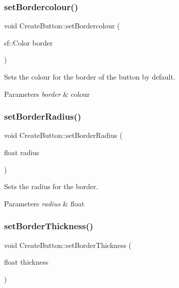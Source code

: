 \subsubsection{\texorpdfstring{set\+Bordercolour()}{setBordercolour()}}
{\footnotesize\ttfamily void Create\+Button\+::set\+Bordercolour (\begin{DoxyParamCaption}\item[{sf\+::\+Color}]{border }\end{DoxyParamCaption})}



Sets the colour for the border of the button by default. 


\begin{DoxyParams}{Parameters}
{\em border} & colour \\
\hline
\end{DoxyParams}
\mbox{\label{class_create_button_ae836b96adddce00e02cb38f503336ec1}} 
\subsubsection{\texorpdfstring{set\+Border\+Radius()}{setBorderRadius()}}
{\footnotesize\ttfamily void Create\+Button\+::set\+Border\+Radius (\begin{DoxyParamCaption}\item[{float}]{radius }\end{DoxyParamCaption})}



Sets the radius for the border. 


\begin{DoxyParams}{Parameters}
{\em radius} & float \\
\hline
\end{DoxyParams}
\mbox{\label{class_create_button_a727a1c1446d4a4b88a3f48346fcab044}} 
\subsubsection{\texorpdfstring{set\+Border\+Thickness()}{setBorderThickness()}}
{\footnotesize\ttfamily void Create\+Button\+::set\+Border\+Thickness (\begin{DoxyParamCaption}\item[{float}]{thickness }\end{DoxyParamCaption})}



